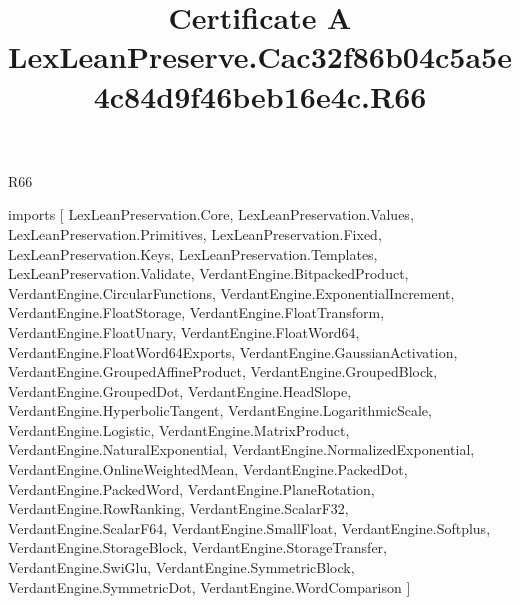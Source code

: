 \begin{lexlean}{R66}
\title{Certificate A LexLeanPreserve.Cac32f86b04c5a5e4c84d9f46beb16e4c.R66}
\begin{coremodule}
imports [
  LexLeanPreservation.Core,
  LexLeanPreservation.Values,
  LexLeanPreservation.Primitives,
  LexLeanPreservation.Fixed,
  LexLeanPreservation.Keys,
  LexLeanPreservation.Templates,
  LexLeanPreservation.Validate,
  VerdantEngine.BitpackedProduct,
  VerdantEngine.CircularFunctions,
  VerdantEngine.ExponentialIncrement,
  VerdantEngine.FloatStorage,
  VerdantEngine.FloatTransform,
  VerdantEngine.FloatUnary,
  VerdantEngine.FloatWord64,
  VerdantEngine.FloatWord64Exports,
  VerdantEngine.GaussianActivation,
  VerdantEngine.GroupedAffineProduct,
  VerdantEngine.GroupedBlock,
  VerdantEngine.GroupedDot,
  VerdantEngine.HeadSlope,
  VerdantEngine.HyperbolicTangent,
  VerdantEngine.LogarithmicScale,
  VerdantEngine.Logistic,
  VerdantEngine.MatrixProduct,
  VerdantEngine.NaturalExponential,
  VerdantEngine.NormalizedExponential,
  VerdantEngine.OnlineWeightedMean,
  VerdantEngine.PackedDot,
  VerdantEngine.PackedWord,
  VerdantEngine.PlaneRotation,
  VerdantEngine.RowRanking,
  VerdantEngine.ScalarF32,
  VerdantEngine.ScalarF64,
  VerdantEngine.SmallFloat,
  VerdantEngine.Softplus,
  VerdantEngine.StorageBlock,
  VerdantEngine.StorageTransfer,
  VerdantEngine.SwiGlu,
  VerdantEngine.SymmetricBlock,
  VerdantEngine.SymmetricDot,
  VerdantEngine.WordComparison
]


\end{coremodule}
\end{lexlean}
